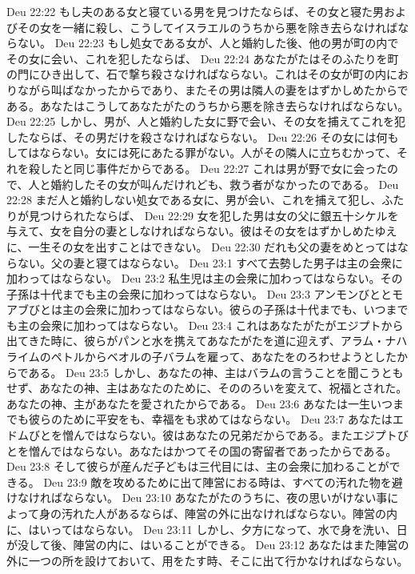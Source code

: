 Deu 22:22  もし夫のある女と寝ている男を見つけたならば、その女と寝た男およびその女を一緒に殺し、こうしてイスラエルのうちから悪を除き去らなければならない。
Deu 22:23  もし処女である女が、人と婚約した後、他の男が町の内でその女に会い、これを犯したならば、
Deu 22:24  あなたがたはそのふたりを町の門にひき出して、石で撃ち殺さなければならない。これはその女が町の内におりながら叫ばなかったからであり、またその男は隣人の妻をはずかしめたからである。あなたはこうしてあなたがたのうちから悪を除き去らなければならない。
Deu 22:25  しかし、男が、人と婚約した女に野で会い、その女を捕えてこれを犯したならば、その男だけを殺さなければならない。
Deu 22:26  その女には何もしてはならない。女には死にあたる罪がない。人がその隣人に立ちむかって、それを殺したと同じ事件だからである。
Deu 22:27  これは男が野で女に会ったので、人と婚約したその女が叫んだけれども、救う者がなかったのである。
Deu 22:28  まだ人と婚約しない処女である女に、男が会い、これを捕えて犯し、ふたりが見つけられたならば、
Deu 22:29  女を犯した男は女の父に銀五十シケルを与えて、女を自分の妻としなければならない。彼はその女をはずかしめたゆえに、一生その女を出すことはできない。
Deu 22:30  だれも父の妻をめとってはならない。父の妻と寝てはならない。
Deu 23:1  すべて去勢した男子は主の会衆に加わってはならない。
Deu 23:2  私生児は主の会衆に加わってはならない。その子孫は十代までも主の会衆に加わってはならない。
Deu 23:3  アンモンびととモアブびとは主の会衆に加わってはならない。彼らの子孫は十代までも、いつまでも主の会衆に加わってはならない。
Deu 23:4  これはあなたがたがエジプトから出てきた時に、彼らがパンと水を携えてあなたがたを道に迎えず、アラム・ナハライムのペトルからベオルの子バラムを雇って、あなたをのろわせようとしたからである。
Deu 23:5  しかし、あなたの神、主はバラムの言うことを聞こうともせず、あなたの神、主はあなたのために、そののろいを変えて、祝福とされた。あなたの神、主があなたを愛されたからである。
Deu 23:6  あなたは一生いつまでも彼らのために平安をも、幸福をも求めてはならない。
Deu 23:7  あなたはエドムびとを憎んではならない。彼はあなたの兄弟だからである。またエジプトびとを憎んではならない。あなたはかつてその国の寄留者であったからである。
Deu 23:8  そして彼らが産んだ子どもは三代目には、主の会衆に加わることができる。
Deu 23:9  敵を攻めるために出て陣営におる時は、すべての汚れた物を避けなければならない。
Deu 23:10  あなたがたのうちに、夜の思いがけない事によって身の汚れた人があるならば、陣営の外に出なければならない。陣営の内に、はいってはならない。
Deu 23:11  しかし、夕方になって、水で身を洗い、日が没して後、陣営の内に、はいることができる。
Deu 23:12  あなたはまた陣営の外に一つの所を設けておいて、用をたす時、そこに出て行かなければならない。
